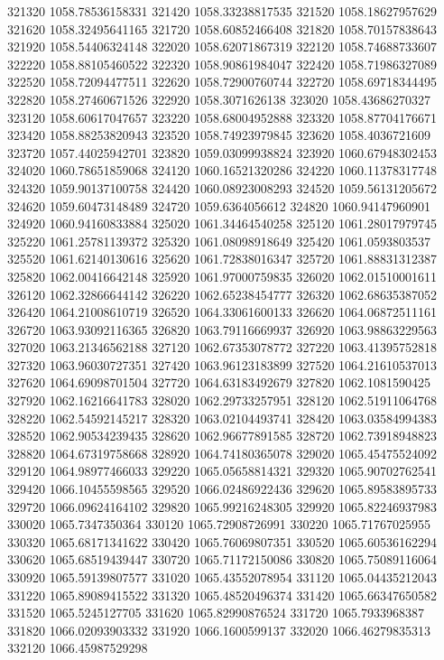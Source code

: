 {321320 1058.78536158331
321420 1058.33238817535
321520 1058.18627957629
321620 1058.32495641165
321720 1058.60852466408
321820 1058.70157838643
321920 1058.54406324148
322020 1058.62071867319
322120 1058.74688733607
322220 1058.88105460522
322320 1058.90861984047
322420 1058.71986327089
322520 1058.72094477511
322620 1058.72900760744
322720 1058.69718344495
322820 1058.27460671526
322920 1058.3071626138
323020 1058.43686270327
323120 1058.60617047657
323220 1058.68004952888
323320 1058.87704176671
323420 1058.88253820943
323520 1058.74923979845
323620 1058.4036721609
323720 1057.44025942701
323820 1059.03099938824
323920 1060.67948302453
324020 1060.78651859068
324120 1060.16521320286
324220 1060.11378317748
324320 1059.90137100758
324420 1060.08923008293
324520 1059.56131205672
324620 1059.60473148489
324720 1059.6364056612
324820 1060.94147960901
324920 1060.94160833884
325020 1061.34464540258
325120 1061.28017979745
325220 1061.25781139372
325320 1061.08098918649
325420 1061.0593803537
325520 1061.62140130616
325620 1061.72838016347
325720 1061.88831312387
325820 1062.00416642148
325920 1061.97000759835
326020 1062.01510001611
326120 1062.32866644142
326220 1062.65238454777
326320 1062.68635387052
326420 1064.21008610719
326520 1064.33061600133
326620 1064.06872511161
326720 1063.93092116365
326820 1063.79116669937
326920 1063.98863229563
327020 1063.21346562188
327120 1062.67353078772
327220 1063.41395752818
327320 1063.96030727351
327420 1063.96123183899
327520 1064.21610537013
327620 1064.69098701504
327720 1064.63183492679
327820 1062.1081590425
327920 1062.16216641783
328020 1062.29733257951
328120 1062.51911064768
328220 1062.54592145217
328320 1063.02104493741
328420 1063.03584994383
328520 1062.90534239435
328620 1062.96677891585
328720 1062.73918948823
328820 1064.67319758668
328920 1064.74180365078
329020 1065.45475524092
329120 1064.98977466033
329220 1065.05658814321
329320 1065.90702762541
329420 1066.10455598565
329520 1066.02486922436
329620 1065.89583895733
329720 1066.09624164102
329820 1065.99216248305
329920 1065.82246937983
330020 1065.7347350364
330120 1065.72908726991
330220 1065.71767025955
330320 1065.68171341622
330420 1065.76069807351
330520 1065.60536162294
330620 1065.68519439447
330720 1065.71172150086
330820 1065.75089116064
330920 1065.59139807577
331020 1065.43552078954
331120 1065.04435212043
331220 1065.89089415522
331320 1065.48520496374
331420 1065.66347650582
331520 1065.5245127705
331620 1065.82990876524
331720 1065.7933968387
331820 1066.02093903332
331920 1066.1600599137
332020 1066.46279835313
332120 1066.45987529298
}
